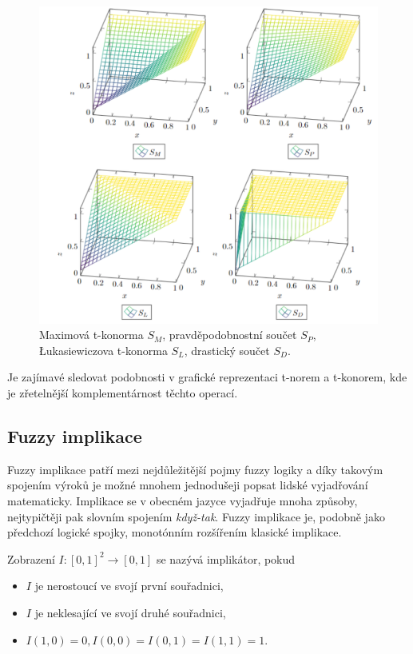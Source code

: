    \begin{figure}[H]
   \caption{ Maximová t-konorma $S_M$, pravděpodobnostní součet $S_P$, Łukasiewiczova t-konorma $S_L$, drastický součet $S_D$.\\}
                \hspace{-1cm}
                \includegraphics[scale=0.65]{template-fig/konormy.pdf}
                \centering
    \end{figure}



Je zajímavé sledovat podobnosti v grafické reprezentaci t-norem a t-konorem, kde je zřetelnější komplementárnost těchto operací.

\subsection{Fuzzy implikace} 


Fuzzy implikace patří mezi nejd\r uležitější pojmy fuzzy logiky a díky takovým spojením výrok\r u je možné mnohem jednodušeji popsat lidské vyjadřování matematicky. Implikace se v obecném jazyce vyjadřuje mnoha zp\r usoby, nejtypičtěji pak slovním spojením \textit{když-tak}. Fuzzy implikace je, podobn\v e jako p\v redchoz\'i logick\'e spojky, monot\'onn\'im roz\v s\'i\v ren\'im klasick\'e implikace.
\begin{definition} \label{impl}
    Zobrazení $I: [0,1]^2 \rightarrow [0,1] $ se nazývá implikátor, pokud
    \begin{itemize}
        \item $I$ je nerostoucí ve svojí první souřadnici,
        \item $I$ je neklesající ve svojí druhé souřadnici,
        \item $I(1,0) = 0, I(0,0) =  I(0,1) = I(1,1) = 1.$
    \end{itemize}
\end{definition}

